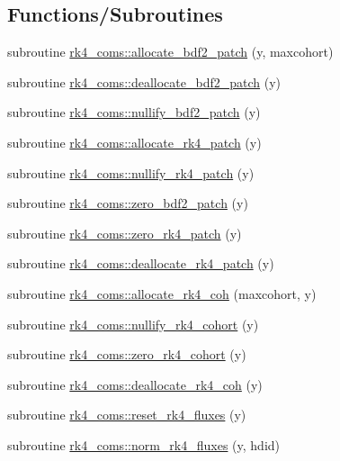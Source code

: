 \subsection*{Functions/\+Subroutines}
\begin{DoxyCompactItemize}
\item 
subroutine \hyperlink{namespacerk4__coms_a292fa2f7c65668f516015eff1a3b74e2}{rk4\+\_\+coms\+::allocate\+\_\+bdf2\+\_\+patch} (y, maxcohort)
\item 
subroutine \hyperlink{namespacerk4__coms_a38274254cb16401c20124f7620f64ab2}{rk4\+\_\+coms\+::deallocate\+\_\+bdf2\+\_\+patch} (y)
\item 
subroutine \hyperlink{namespacerk4__coms_a22f63b46db00ae302b1ae688abecc22d}{rk4\+\_\+coms\+::nullify\+\_\+bdf2\+\_\+patch} (y)
\item 
subroutine \hyperlink{namespacerk4__coms_a52256ca0348235c95a467581d6067dac}{rk4\+\_\+coms\+::allocate\+\_\+rk4\+\_\+patch} (y)
\item 
subroutine \hyperlink{namespacerk4__coms_a34a6a346af3d032c14f416435801598a}{rk4\+\_\+coms\+::nullify\+\_\+rk4\+\_\+patch} (y)
\item 
subroutine \hyperlink{namespacerk4__coms_a4dc0257365f3ec4614c2e41451517e28}{rk4\+\_\+coms\+::zero\+\_\+bdf2\+\_\+patch} (y)
\item 
subroutine \hyperlink{namespacerk4__coms_a4206f404f555c50ee6570211356bd537}{rk4\+\_\+coms\+::zero\+\_\+rk4\+\_\+patch} (y)
\item 
subroutine \hyperlink{namespacerk4__coms_ad2699a814198d0d9a0133d1eb579542c}{rk4\+\_\+coms\+::deallocate\+\_\+rk4\+\_\+patch} (y)
\item 
subroutine \hyperlink{namespacerk4__coms_ac355c3cf81ffef1c269338cf8b07c4bc}{rk4\+\_\+coms\+::allocate\+\_\+rk4\+\_\+coh} (maxcohort, y)
\item 
subroutine \hyperlink{namespacerk4__coms_afe54efd0ad9ab38983314ca0d2557e26}{rk4\+\_\+coms\+::nullify\+\_\+rk4\+\_\+cohort} (y)
\item 
subroutine \hyperlink{namespacerk4__coms_a1053434edb41147cb74257d6339eab8f}{rk4\+\_\+coms\+::zero\+\_\+rk4\+\_\+cohort} (y)
\item 
subroutine \hyperlink{namespacerk4__coms_a56a9eb1fd462e81374c5993b69d3d05c}{rk4\+\_\+coms\+::deallocate\+\_\+rk4\+\_\+coh} (y)
\item 
subroutine \hyperlink{namespacerk4__coms_a02aeb5f0e99479e6eef3029472a79781}{rk4\+\_\+coms\+::reset\+\_\+rk4\+\_\+fluxes} (y)
\item 
subroutine \hyperlink{namespacerk4__coms_ad9cf07917e6000f8f46e84428647b494}{rk4\+\_\+coms\+::norm\+\_\+rk4\+\_\+fluxes} (y, hdid)

\end{DoxyCompactItemize}
